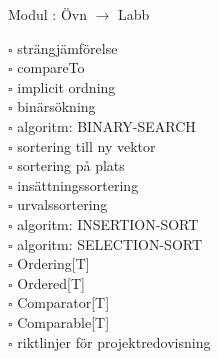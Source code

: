 
    Modul : Övn  $\rightarrow$ Labb 
    \begin{multicols}{3}\SlideFontTiny
    $\square$ strängjämförelse \\
$\square$ compareTo \\
$\square$ implicit ordning \\
$\square$ binärsökning \\
$\square$ algoritm: BINARY-SEARCH \\
$\square$ sortering till ny vektor \\
$\square$ sortering på plats \\
$\square$ insättningssortering \\
$\square$ urvalssortering \\
$\square$ algoritm: INSERTION-SORT \\
$\square$ algoritm: SELECTION-SORT \\
$\square$ Ordering[T] \\
$\square$ Ordered[T] \\
$\square$ Comparator[T] \\
$\square$ Comparable[T] \\
$\square$ riktlinjer för projektredovisning \\
    \end{multicols}
    